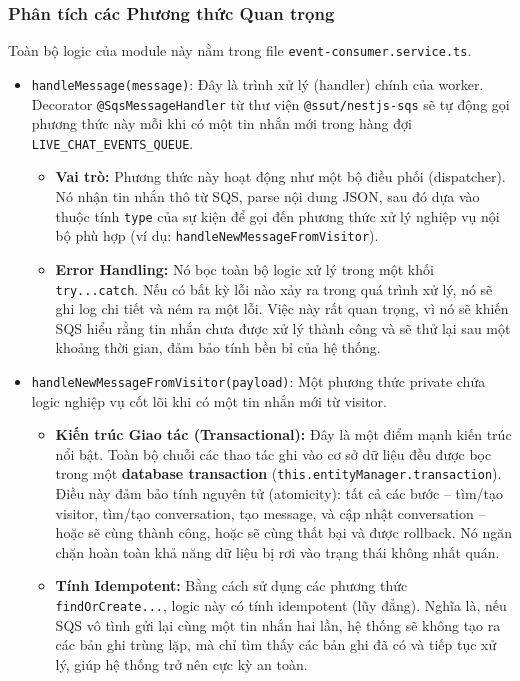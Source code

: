 \subsubsection{Phân tích các Phương thức Quan trọng}

Toàn bộ logic của module này nằm trong file \texttt{event-consumer.service.ts}.

\begin{itemize}
    \item \texttt{handleMessage(message)}: Đây là trình xử lý (handler) chính của worker. Decorator \texttt{@SqsMessageHandler} từ thư viện \texttt{@ssut/nestjs-sqs} sẽ tự động gọi phương thức này mỗi khi có một tin nhắn mới trong hàng đợi \texttt{LIVE\_CHAT\_EVENTS\_QUEUE}.
    \begin{itemize}
        \item \textbf{Vai trò:} Phương thức này hoạt động như một bộ điều phối (dispatcher). Nó nhận tin nhắn thô từ SQS, parse nội dung JSON, sau đó dựa vào thuộc tính \texttt{type} của sự kiện để gọi đến phương thức xử lý nghiệp vụ nội bộ phù hợp (ví dụ: \texttt{handleNewMessageFromVisitor}).
        \item \textbf{Error Handling:} Nó bọc toàn bộ logic xử lý trong một khối \texttt{try...catch}. Nếu có bất kỳ lỗi nào xảy ra trong quá trình xử lý, nó sẽ ghi log chi tiết và ném ra một lỗi. Việc này rất quan trọng, vì nó sẽ khiến SQS hiểu rằng tin nhắn chưa được xử lý thành công và sẽ thử lại sau một khoảng thời gian, đảm bảo tính bền bỉ của hệ thống.
    \end{itemize}
    
    \item \texttt{handleNewMessageFromVisitor(payload)}: Một phương thức private chứa logic nghiệp vụ cốt lõi khi có một tin nhắn mới từ visitor.
    \begin{itemize}
        \item \textbf{Kiến trúc Giao tác (Transactional):} Đây là một điểm mạnh kiến trúc nổi bật. Toàn bộ chuỗi các thao tác ghi vào cơ sở dữ liệu đều được bọc trong một \textbf{database transaction} (\texttt{this.entityManager.transaction}). Điều này đảm bảo tính nguyên tử (atomicity): tất cả các bước -- tìm/tạo visitor, tìm/tạo conversation, tạo message, và cập nhật conversation -- hoặc sẽ cùng thành công, hoặc sẽ cùng thất bại và được rollback. Nó ngăn chặn hoàn toàn khả năng dữ liệu bị rơi vào trạng thái không nhất quán.
        \item \textbf{Tính Idempotent:} Bằng cách sử dụng các phương thức \texttt{findOrCreate...}, logic này có tính idempotent (lũy đẳng). Nghĩa là, nếu SQS vô tình gửi lại cùng một tin nhắn hai lần, hệ thống sẽ không tạo ra các bản ghi trùng lặp, mà chỉ tìm thấy các bản ghi đã có và tiếp tục xử lý, giúp hệ thống trở nên cực kỳ an toàn.
    \end{itemize}
\end{itemize}